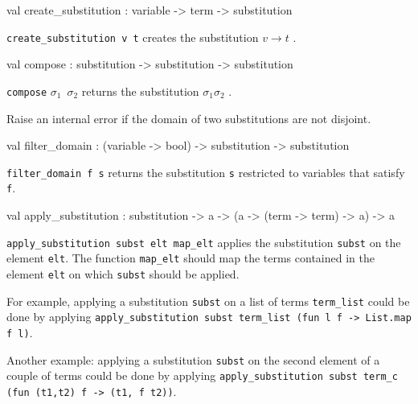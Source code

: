\label{val:Term.create-underscoresubstitution}\begin{ocamldoccode}
val create_substitution : variable -> term -> substitution
\end{ocamldoccode}
\begin{ocamldocdescription}
{\tt{create\_substitution v t}} creates the substitution ${v \rightarrow t}$ .


\end{ocamldocdescription}




\label{val:Term.compose}\begin{ocamldoccode}
val compose : substitution -> substitution -> substitution
\end{ocamldoccode}
\begin{ocamldocdescription}
{\tt{compose}} $\sigma_1$~$\sigma_2$  returns the substitution $\sigma_1\sigma_2$ .


    \lowdebug  Raise an internal error if the domain of two substitutions are not disjoint.


\end{ocamldocdescription}




\label{val:Term.filter-underscoredomain}\begin{ocamldoccode}
val filter_domain : (variable -> bool) -> substitution -> substitution
\end{ocamldoccode}
\begin{ocamldocdescription}
{\tt{filter\_domain f s}} returns the substitution {\tt{s}} restricted to variables that satisfy {\tt{f}}.


\end{ocamldocdescription}




\label{val:Term.apply-underscoresubstitution}\begin{ocamldoccode}
val apply_substitution :
  substitution -> {\textquotesingle}a -> ({\textquotesingle}a -> (term -> term) -> {\textquotesingle}a) -> {\textquotesingle}a
\end{ocamldoccode}
\begin{ocamldocdescription}
{\tt{apply\_substitution subst elt map\_elt}} applies the substitution {\tt{subst}} on the element {\tt{elt}}. The function
    {\tt{map\_elt}} should map the terms contained in the element {\tt{elt}} on which {\tt{subst}} should be applied.


    For example, applying a substitution {\tt{subst}} on a list of terms {\tt{term\_list}} 
    could be done by applying {\tt{apply\_substitution subst term\_list (fun l f -> List.map f l)}}.


    Another example: applying a substitution {\tt{subst}} on the second element of a couple of terms could be 
    done by applying {\tt{apply\_substitution subst term\_c (fun (t1,t2) f -> (t1, f t2))}}.


\end{ocamldocdescription}




